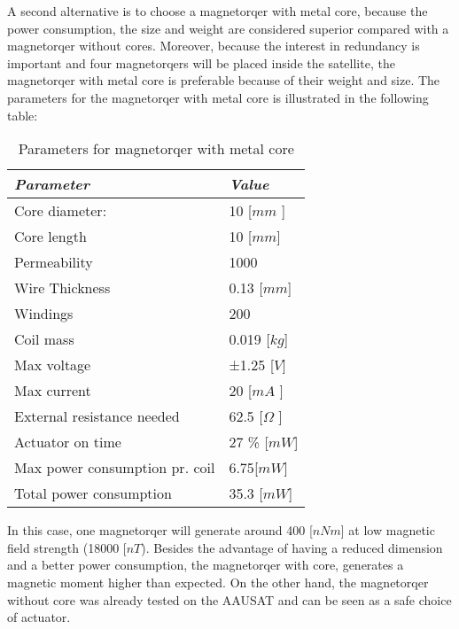 A second alternative is to choose a magnetorqer with metal core, because the power consumption, the size and weight are considered superior compared with a magnetorqer without cores. Moreover, because the interest in redundancy is important and four magnetorqers will be placed inside the satellite, the magnetorqer with metal core is preferable because of their weight and size. The parameters for the magnetorqer with metal core is illustrated in the following table:
\begin{table}[H]
	\centering
	\begin{tabular}{|l|l|}
		\hline
		\textit{\textbf{Parameter}}     & \textit{\textbf{Value}}               \\ \hline
		Core diameter:                       & 10 {[}$mm$ {]}                           \\ \hline
		Core length             			   & 10 {[}$mm${]}                             \\ \hline
		Permeability                           & 1000                                      	     \\ \hline
		Wire Thickness                      & 0.13 [$mm$]                                 \\ \hline
		Windings                                & 200 											      \\ \hline
		Coil mass                               & 0.019 {[}$kg${]}                               \\ \hline
		Max voltage                			  & ±1.25 {[}$V${]}                                  \\ \hline
		Max current							  & 20 {[}$mA$ {]}                                    \\ \hline
		External resistance needed   & 62.5 {[}$\Omega$ {]} 					  	 \\ \hline
		Actuator on time			       & 27 \% {[}$mW${]}                                  \\ \hline
		Max power consumption pr. coil     & 6.75{[}$mW${]} 				           \\ \hline
		Total power consumption		& 35.3 {[}$mW${]}                                      \\ \hline
	\end{tabular}
	\caption{Parameters for magnetorqer with metal core}
	\label{table:for1}
\end{table}
In this case, one magnetorqer will generate around 400 [$nNm$] at low magnetic field strength (18000 [$nT$). Besides the advantage of having a reduced dimension and a better power consumption, the magnetorqer with core, generates a magnetic moment higher than expected. On the other hand, the magnetorqer without core was already tested on the AAUSAT and can be seen as a safe choice of actuator.

